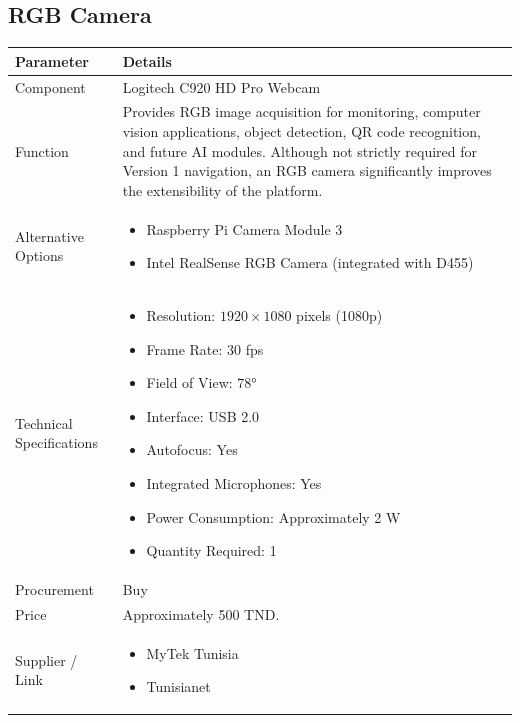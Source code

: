 \documentclass[12pt,a4paper]{article}
\begin{document}
\subsection{RGB Camera}

\begin{longtable}{|p{4cm}|p{10cm}|}
\hline
\textbf{Parameter} & \textbf{Details} \\
\hline

Component &
Logitech C920 HD Pro Webcam \\
\hline

Function &
Provides RGB image acquisition for monitoring, computer vision applications, object detection, QR code recognition, and future AI modules. Although not strictly required for Version 1 navigation, an RGB camera significantly improves the extensibility of the platform. \\
\hline


Alternative Options &
\begin{itemize}
\item Raspberry Pi Camera Module 3
\item Intel RealSense RGB Camera (integrated with D455)
\end{itemize}
\\
\hline

Technical Specifications &
\begin{itemize}
\item Resolution: $1920 \times 1080$ pixels (1080p)
\item Frame Rate: 30 fps
\item Field of View: $78°$
\item Interface: USB 2.0
\item Autofocus: Yes
\item Integrated Microphones: Yes
\item Power Consumption: Approximately 2 W
\item Quantity Required: 1
\end{itemize}
\\
\hline

Procurement &
Buy \\
\hline

Price &
Approximately 500 TND. \\
\hline

Supplier / Link &
\begin{itemize}
\item MyTek Tunisia
\item Tunisianet
\end{itemize}
\\
\hline


\end{longtable}
\end{document}
